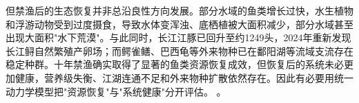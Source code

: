 但禁渔后的生态恢复并非总沿良性方向发展。部分水域的鱼类增长过快，水生植物和浮游动物受到过度摄食，导致水体变浑浊、底栖植被大面积减少，部分水域甚至出现大面积"水下荒漠"。与此同时，长江江豚已回升至约1249头，2024年重新发现长江鲟自然繁殖产卵场；而鳄雀鳝、巴西龟等外来物种已在鄱阳湖等流域支流存在稳定种群。十年禁渔确实取得了显著的鱼类资源恢复成效，但恢复后的系统未必更加健康，营养级失衡、江湖连通不足和外来物种扩散依然存在。因此有必要用统一动力学模型把"资源恢复"与"系统健康"分开评估。
\cite{report2022,report2023}。
